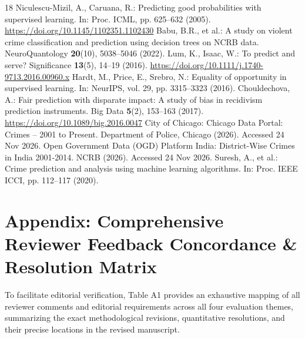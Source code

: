 \documentclass[runningheads]{llncs}
\begin{document}
\begin{thebibliography}{18}
 Niculescu-Mizil, A., Caruana, R.: Predicting good probabilities with supervised learning. In: Proc. ICML, pp. 625--632 (2005). \url{https://doi.org/10.1145/1102351.1102430}
 Babu, B.R., et al.: A study on violent crime classification and prediction using decision trees on NCRB data. NeuroQuantology \textbf{20}(10), 5038--5046 (2022).
 Lum, K., Isaac, W.: To predict and serve? Significance \textbf{13}(5), 14--19 (2016). \url{https://doi.org/10.1111/j.1740-9713.2016.00960.x}
 Hardt, M., Price, E., Srebro, N.: Equality of opportunity in supervised learning. In: NeurIPS, vol. 29, pp. 3315--3323 (2016).
 Chouldechova, A.: Fair prediction with disparate impact: A study of bias in recidivism prediction instruments. Big Data \textbf{5}(2), 153--163 (2017). \url{https://doi.org/10.1089/big.2016.0047}
 City of Chicago: Chicago Data Portal: Crimes -- 2001 to Present. Department of Police, Chicago (2026). Accessed 24 Nov 2026.
 Open Government Data (OGD) Platform India: District-Wise Crimes in India 2001-2014. NCRB (2026). Accessed 24 Nov 2026.
 Suresh, A., et al.: Crime prediction and analysis using machine learning algorithms. In: Proc. IEEE ICCI, pp. 112--117 (2020).
\end{thebibliography}


\appendix
\section*{Appendix: Comprehensive Reviewer Feedback Concordance \& Resolution Matrix}
To facilitate editorial verification, Table A1 provides an exhaustive mapping of all reviewer comments and editorial requirements across all four evaluation themes, summarizing the exact methodological revisions, quantitative resolutions, and their precise locations in the revised manuscript.
\end{document}
